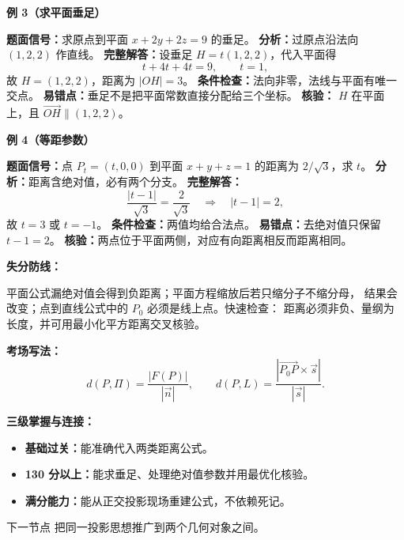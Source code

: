 \begin{knowledgeBox}
\textbf{例 3（求平面垂足）}

\textbf{题面信号：}求原点到平面 \(x+2y+2z=9\) 的垂足。
\textbf{分析：}过原点沿法向 \((1,2,2)\) 作直线。
\textbf{完整解答：}设垂足 \(H=t(1,2,2)\)，代入平面得
\[
t+4t+4t=9,\qquad t=1,
\]
故 \(H=(1,2,2)\)，距离为 \(|OH|=3\)。
\textbf{条件检查：}法向非零，法线与平面有唯一交点。
\textbf{易错点：}垂足不是把平面常数直接分配给三个坐标。
\textbf{核验：} \(H\) 在平面上，且 \(\overrightarrow{OH}\parallel(1,2,2)\)。

\textbf{例 4（等距参数）}

\textbf{题面信号：}点 \(P_t=(t,0,0)\) 到平面
\(x+y+z=1\) 的距离为 \(2/\sqrt3\)，求 \(t\)。
\textbf{分析：}距离含绝对值，必有两个分支。
\textbf{完整解答：}
\[
\frac{|t-1|}{\sqrt3}=\frac2{\sqrt3}
\quad\Longrightarrow\quad |t-1|=2,
\]
故 \(t=3\) 或 \(t=-1\)。
\textbf{条件检查：}两值均给合法点。
\textbf{易错点：}去绝对值只保留 \(t-1=2\)。
\textbf{核验：}两点位于平面两侧，对应有向距离相反而距离相同。

\textbf{失分防线：}

平面公式漏绝对值会得到负距离；平面方程缩放后若只缩分子不缩分母，
结果会改变；点到直线公式中的 \(P_0\) 必须是线上点。快速检查：
距离必须非负、量纲为长度，并可用最小化平方距离交叉核验。

\textbf{考场写法：}
\[
\boxed{d(P,\Pi)=\frac{|F(P)|}{|\vec n|},\qquad
d(P,L)=\frac{|\overrightarrow{P_0P}\times\vec s|}{|\vec s|}.}
\]

\textbf{三级掌握与连接：}
\begin{itemize}
  \item \textbf{基础过关：}能准确代入两类距离公式。
  \item \textbf{130 分以上：}能求垂足、处理绝对值参数并用最优化核验。
  \item \textbf{满分能力：}能从正交投影现场重建公式，不依赖死记。
\end{itemize}
下一节点 
把同一投影思想推广到两个几何对象之间。
\end{knowledgeBox}



